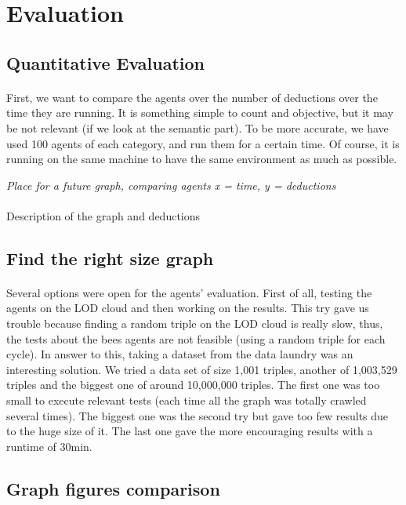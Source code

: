 \documentclass{article}
\begin{document}
\section{Evaluation}
	\subsection{Quantitative Evaluation}
		\paragraph{}
			First, we want to compare the agents over the number of deductions over the time they are running.
			It is something simple to count and objective, but it may be not relevant (if we look at the semantic part).
			To be more accurate, we have used 100 agents of each category, and run them for a certain time.
			Of course, it is running on the same machine to have the same environment as much as possible.
		\begin{center}
			\textit{Place for a future graph, comparing agents x = time, y = deductions}
		\end{center}
		\paragraph{}
			Description of the graph and deductions
	\subsection{Find the right size graph}
		\paragraph{}
			Several options were open for the agents' evaluation.
			First of all, testing the agents on the LOD cloud and then working on the results.
			This try gave us trouble because finding a random triple on the LOD cloud is really slow,
			thus, the tests about the bees agents are not feasible (using a random triple for each cycle).
			In answer to this, taking a dataset from the data laundry was an interesting solution.
			We tried a data set of size 1,001 triples, another of 1,003,529 triples and the biggest one of around 10,000,000 triples.
			The first one was too small to execute relevant tests (each time all the graph was totally crawled several times).
			The biggest one was the second try but gave too few results due to the huge size of it.
			The last one gave the more encouraging results with a runtime of 30min.
	\subsection{Graph figures comparison}
\end{document}

